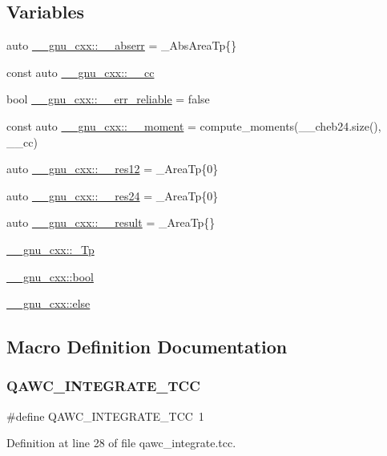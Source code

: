 \subsection*{Variables}
\begin{DoxyCompactItemize}
\item 
auto \hyperlink{namespace____gnu__cxx_a72f736cff127f1574e91a301de9e074b}{\+\_\+\+\_\+gnu\+\_\+cxx\+::\+\_\+\+\_\+abserr} = \+\_\+\+Abs\+Area\+Tp\{\}
\item 
const auto \hyperlink{namespace____gnu__cxx_a7994ff975ddada084e4a738578302940}{\+\_\+\+\_\+gnu\+\_\+cxx\+::\+\_\+\+\_\+cc}
\item 
bool \hyperlink{namespace____gnu__cxx_a989f5db5dc6da4eeca54cd1f93ec82ee}{\+\_\+\+\_\+gnu\+\_\+cxx\+::\+\_\+\+\_\+err\+\_\+reliable} = false
\item 
const auto \hyperlink{namespace____gnu__cxx_aa353478f1f8d25130d4fc48bf804a24c}{\+\_\+\+\_\+gnu\+\_\+cxx\+::\+\_\+\+\_\+moment} = compute\+\_\+moments(\+\_\+\+\_\+cheb24.\+size(), \+\_\+\+\_\+cc)
\item 
auto \hyperlink{namespace____gnu__cxx_a6ea2384a750bf3ec4778454ae3b4b5c3}{\+\_\+\+\_\+gnu\+\_\+cxx\+::\+\_\+\+\_\+res12} = \+\_\+\+Area\+Tp\{0\}
\item 
auto \hyperlink{namespace____gnu__cxx_af9fb40bd2c7cde535117200af946d670}{\+\_\+\+\_\+gnu\+\_\+cxx\+::\+\_\+\+\_\+res24} = \+\_\+\+Area\+Tp\{0\}
\item 
auto \hyperlink{namespace____gnu__cxx_a500ea9f53aeaecd8c2ae657503450578}{\+\_\+\+\_\+gnu\+\_\+cxx\+::\+\_\+\+\_\+result} = \+\_\+\+Area\+Tp\{\}
\item 
\hyperlink{namespace____gnu__cxx_a3b19a9c800ca194374ef9172290f7d79}{\+\_\+\+\_\+gnu\+\_\+cxx\+::\+\_\+\+Tp}
\item 
\hyperlink{namespace____gnu__cxx_ae83aca57f97767d5d09188718728a0ac}{\+\_\+\+\_\+gnu\+\_\+cxx\+::bool}
\item 
\hyperlink{namespace____gnu__cxx_ad845303a33fef33286c11510aea1d5cc}{\+\_\+\+\_\+gnu\+\_\+cxx\+::else}
\end{DoxyCompactItemize}


\subsection{Macro Definition Documentation}
\mbox{\label{qawc__integrate_8tcc_a63243fdc5c0aac7ff9c666423211b628}} 
\subsubsection{\texorpdfstring{Q\+A\+W\+C\+\_\+\+I\+N\+T\+E\+G\+R\+A\+T\+E\+\_\+\+T\+CC}{QAWC\_INTEGRATE\_TCC}}
{\footnotesize\ttfamily \#define Q\+A\+W\+C\+\_\+\+I\+N\+T\+E\+G\+R\+A\+T\+E\+\_\+\+T\+CC~1}



Definition at line 28 of file qawc\+\_\+integrate.\+tcc.

